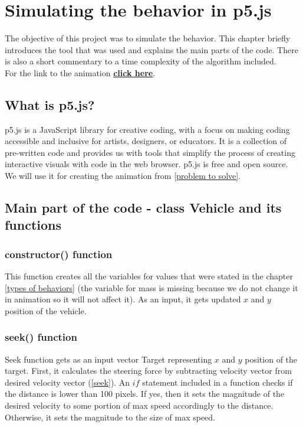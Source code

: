 \documentclass[10pt,twoside,english,a4paper]{article}
\begin{document}
\section{Simulating the behavior in p5.js} \label{simulation} 

The objective of this project was to simulate the behavior. This chapter briefly
introduces the tool that was used and explains the main parts of the code. There is also a short 
commentary to a time complexity of the algorithm included.\\
For the link to the animation \textbf{\underline{\href{https://editor.p5js.org/RichardCernansky/sketches/E0zAXshWw}{click here}}}.

\subsection{What is p5.js?} \label{p5 char} 

p5.js is a JavaScript library for creative coding, with a focus on 
making coding accessible and inclusive for artists, designers, or 
educators. It is a collection of pre-written code and provides us 
with tools that simplify the process of creating interactive visuals 
with code in the web browser. p5.js is free and open source. We 
will use it for creating the animation from \ref{problem to solve}. 

\subsection{Main part of the code - class Vehicle and its functions} \label{class Vehicle} 

\subsubsection{constructor() function} \label{constructorf} 

This function creates all the variables for values that were stated in the 
chapter \ref{types of behaviors} (the variable for mass is missing because we do not change it in animation
so it will not affect it). As an input, it gets updated $x$ and $y$ position
of the vehicle. 

\subsubsection{seek() function} \label{seekf} 

Seek function gets as an input vector Target representing $x$ and $y$ position
of the target. First, it calculates the steering force by subtracting velocity vector
from desired velocity vector (\ref{seek}). An $if$ statement included in a function checks if 
the distance is lower than 100 pixels. If yes, then it sets the magnitude of the 
desired velocity to some portion of max speed accordingly to the distance. 
Otherwise, it sets the magnitude to the size of max speed.
\end{document}
